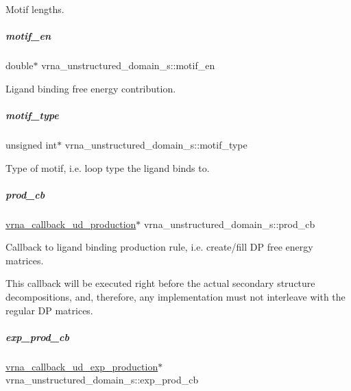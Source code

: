Motif lengths. 

\mbox{\label{group__domains__up_aae4f0a45419784fb7c244bce2781403d}} 
\subparagraph{\texorpdfstring{motif\+\_\+en}{motif\_en}}
{\footnotesize\ttfamily double$\ast$ vrna\+\_\+unstructured\+\_\+domain\+\_\+s\+::motif\+\_\+en}



Ligand binding free energy contribution. 

\mbox{\label{group__domains__up_a3f0c026cced369ff176a66b2820f2057}} 
\subparagraph{\texorpdfstring{motif\+\_\+type}{motif\_type}}
{\footnotesize\ttfamily unsigned int$\ast$ vrna\+\_\+unstructured\+\_\+domain\+\_\+s\+::motif\+\_\+type}



Type of motif, i.\+e. loop type the ligand binds to. 

\mbox{\label{group__domains__up_ac2656d57130ac56e85212836482cbe80}} 
\subparagraph{\texorpdfstring{prod\+\_\+cb}{prod\_cb}}
{\footnotesize\ttfamily \mbox{\hyperlink{group__domains__up_ga4fdfc02c1b660c07f2d887772f02a0a1}{vrna\+\_\+callback\+\_\+ud\+\_\+production}}$\ast$ vrna\+\_\+unstructured\+\_\+domain\+\_\+s\+::prod\+\_\+cb}



Callback to ligand binding production rule, i.\+e. create/fill DP free energy matrices. 

This callback will be executed right before the actual secondary structure decompositions, and, therefore, any implementation must not interleave with the regular DP matrices. \mbox{\label{group__domains__up_a181ae6ec67f77e68899ec6a0780f3e01}} 
\subparagraph{\texorpdfstring{exp\+\_\+prod\+\_\+cb}{exp\_prod\_cb}}
{\footnotesize\ttfamily \mbox{\hyperlink{group__domains__up_ga33d78327dcd04c1ca5ab2887edc18c7b}{vrna\+\_\+callback\+\_\+ud\+\_\+exp\+\_\+production}}$\ast$ vrna\+\_\+unstructured\+\_\+domain\+\_\+s\+::exp\+\_\+prod\+\_\+cb}



